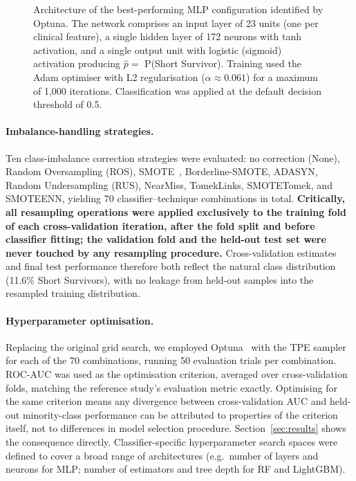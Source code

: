 \documentclass[preprint,12pt]{elsarticle}
\begin{document}
\begin{figure}[ht!]
\caption{Architecture of the best-performing MLP configuration identified
  by Optuna. The network comprises an input layer of 23 units (one per
  clinical feature), a single hidden layer of 172 neurons with tanh
  activation, and a single output unit with logistic (sigmoid) activation
  producing $\hat{p} =$ P(Short Survivor). Training used the Adam
  optimiser with L2 regularisation ($\alpha \approx 0.061$) for a
  maximum of 1{,}000 iterations. Classification was applied at the
  default decision threshold of 0.5.}
\label{fig:mlp_arch}
\end{figure}


\paragraph{Imbalance-handling strategies.}
Ten class-imbalance correction strategies were evaluated: no correction (None),
Random Oversampling (ROS), SMOTE~\cite{chawla2002smote}, Borderline-SMOTE,
ADASYN, Random Undersampling (RUS), NearMiss, TomekLinks, SMOTETomek, and
SMOTEENN, yielding 70 classifier--technique combinations in total.
\textbf{Critically, all resampling operations were applied exclusively to the
training fold of each cross-validation iteration, after the fold split and before
classifier fitting; the validation fold and the held-out test set were never
touched by any resampling procedure.} Cross-validation estimates and final test
performance therefore both reflect the natural class distribution (11.6\% Short
Survivors), with no leakage from held-out samples into the resampled training
distribution.

\paragraph{Hyperparameter optimisation.}
Replacing the original grid search, we employed Optuna~\cite{optuna2019} with the
TPE sampler for each of the 70 combinations, running 50 evaluation trials per
combination. ROC-AUC was used as the optimisation criterion, averaged over
cross-validation folds, matching the reference study's evaluation metric exactly.
Optimising for the same criterion means any divergence between cross-validation
AUC and held-out minority-class performance can be attributed to properties of the
criterion itself, not to differences in model selection procedure.
Section~\ref{sec:results} shows the consequence directly.
Classifier-specific hyperparameter
search spaces were defined to cover a broad range of architectures (e.g.\ number
of layers and neurons for MLP; number of estimators and tree depth for RF and
LightGBM).
\end{document}
